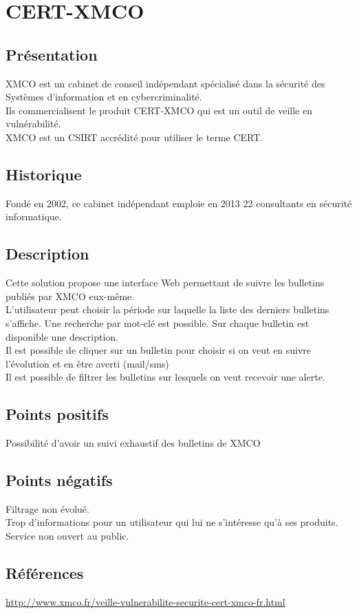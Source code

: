 \section{CERT-XMCO}
\thispagestyle{plain}
\subsection{Présentation}
XMCO est un cabinet de conseil indépendant spécialisé dans la sécurité des Systèmes d’information et en cybercriminalité.\\
Ils commercialisent le produit CERT-XMCO qui est un outil de veille en vulnérabilité.\\
XMCO est un CSIRT accrédité pour utiliser le terme CERT.\\

\subsection{Historique}
Fondé en 2002, ce cabinet indépendant emploie en 2013 22 consultants en sécurité informatique.

\subsection{Description}
Cette solution propose une interface Web permettant de suivre les bulletins publiés par XMCO eux-même.\\
L’utilisateur peut choisir la période sur laquelle la liste des derniers bulletins s’affiche. Une recherche par mot-clé est possible. Sur chaque bulletin est disponible une description.\\
Il est possible de cliquer sur un bulletin pour choisir si on veut en suivre l’évolution et en être averti (mail/sms)\\
Il est possible de filtrer les bulletins sur lesquels on veut recevoir une alerte.\\

\subsection{Points positifs}
Possibilité d’avoir un suivi exhaustif des bulletins de XMCO

\subsection{Points négatifs}
Filtrage non évolué.\\
Trop d’informations pour un utilisateur qui lui ne s’intéresse qu’à ses produits.\\
Service non ouvert au public.\\

\subsection{Références}
\small
\noindent
\url{http://www.xmco.fr/veille-vulnerabilite-securite-cert-xmco-fr.html}
\normalsize

